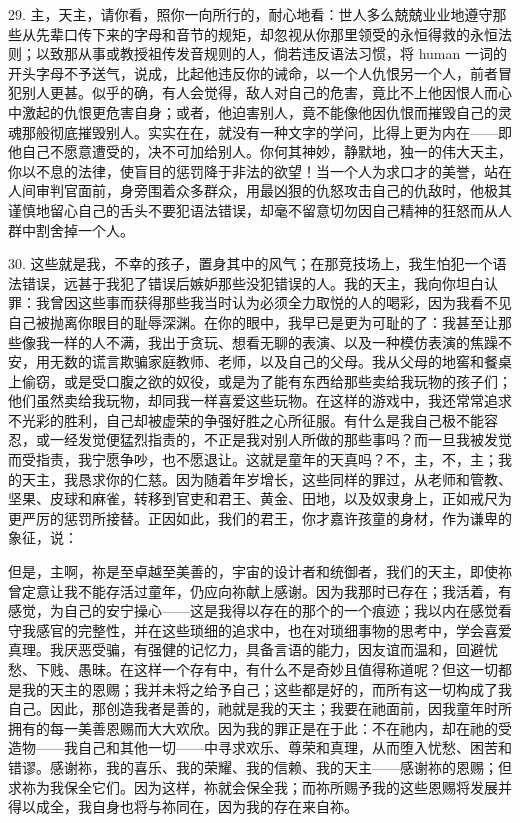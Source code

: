 29. 主，天主，请你看，照你一向所行的，耐心地看：世人多么兢兢业业地遵守那些从先辈口传下来的字母和音节的规矩，却忽视从你那里领受的永恒得救的永恒法则；以致那从事或教授祖传发音规则的人，倘若违反语法习惯，将 human 一词的开头字母不予送气，说成，比起他违反你的诫命，以一个人仇恨另一个人，前者冒犯别人更甚。似乎的确，有人会觉得，敌人对自己的危害，竟比不上他因恨人而心中激起的仇恨更危害自身；或者，他迫害别人，竟不能像他因仇恨而摧毁自己的灵魂那般彻底摧毁别人。实实在在，就没有一种文字的学问，比得上更为内在——即他自己不愿意遭受的，决不可加给别人。你何其神妙，静默地，独一的伟大天主，你以不息的法律，使盲目的惩罚降于非法的欲望！当一个人为求口才的美誉，站在人间审判官面前，身旁围着众多群众，用最凶狠的仇怒攻击自己的仇敌时，他极其谨慎地留心自己的舌头不要犯语法错误，却毫不留意切勿因自己精神的狂怒而从人群中割舍掉一个人。\par

30. 这些就是我，不幸的孩子，置身其中的风气；在那竞技场上，我生怕犯一个语法错误，远甚于我犯了错误后嫉妒那些没犯错误的人。我的天主，我向你坦白认罪：我曾因这些事而获得那些我当时认为必须全力取悦的人的喝彩，因为我看不见自己被抛离你眼目的耻辱深渊。在你的眼中，我早已是更为可耻的了：我甚至让那些像我一样的人不满，我出于贪玩、想看无聊的表演、以及一种模仿表演的焦躁不安，用无数的谎言欺骗家庭教师、老师，以及自己的父母。我从父母的地窖和餐桌上偷窃，或是受口腹之欲的奴役，或是为了能有东西给那些卖给我玩物的孩子们；他们虽然卖给我玩物，却同我一样喜爱这些玩物。在这样的游戏中，我还常常追求不光彩的胜利，自己却被虚荣的争强好胜之心所征服。有什么是我自己极不能容忍，或一经发觉便猛烈指责的，不正是我对别人所做的那些事吗？而一旦我被发觉而受指责，我宁愿争吵，也不愿退让。这就是童年的天真吗？不，主，不，主；我的天主，我恳求你的仁慈。因为随着年岁增长，这些同样的罪过，从老师和管教、坚果、皮球和麻雀，转移到官吏和君王、黄金、田地，以及奴隶身上，正如戒尺为更严厉的惩罚所接替。正因如此，我们的君王，你才嘉许孩童的身材，作为谦卑的象征，说：\par

但是，主啊，祢是至卓越至美善的，宇宙的设计者和统御者，我们的天主，即使祢曾定意让我不能存活过童年，仍应向祢献上感谢。因为我那时已存在；我活着，有感觉，为自己的安宁操心——这是我得以存在的那个的一个痕迹；我以内在感觉看守我感官的完整性，并在这些琐细的追求中，也在对琐细事物的思考中，学会喜爱真理。我厌恶受骗，有强健的记忆力，具备言语的能力，因友谊而温和，回避忧愁、下贱、愚昧。在这样一个存有中，有什么不是奇妙且值得称道呢？但这一切都是我的天主的恩赐；我并未将之给予自己；这些都是好的，而所有这一切构成了我自己。因此，那创造我者是善的，祂就是我的天主；我要在祂面前，因我童年时所拥有的每一美善恩赐而大大欢欣。因为我的罪正是在于此：不在祂内，却在祂的受造物——我自己和其他一切——中寻求欢乐、尊荣和真理，从而堕入忧愁、困苦和错谬。感谢祢，我的喜乐、我的荣耀、我的信赖、我的天主——感谢祢的恩赐；但求祢为我保全它们。因为这样，祢就会保全我；而祢所赐予我的这些恩赐将发展并得以成全，我自身也将与祢同在，因为我的存在来自祢。\par

